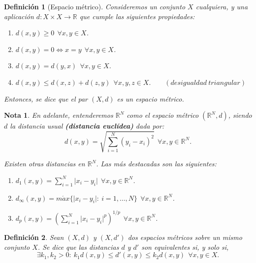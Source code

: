 \documentclass[11pt, a4paper, titlepage]{article}
\providecommand{\abs}[1]{\lvert#1\rvert}
\theoremstyle{theorem-style}
\theoremstyle{definition-style}
\newtheorem*{ndef}{Definición}
\theoremstyle{remark-style}
\newtheorem*{nota}{Nota}
\theoremstyle{example-style}
\newenvironment{nlist}
{\begin{enumerate}
\renewcommand\labelenumi{(\emph{\roman{enumi})}}}
{\end{enumerate}}
\begin{document}
\begin{ndef}[Espacio métrico]
Consideremos un conjunto $X$ cualquiera, y una aplicación \mbox{$d:X\times X \longrightarrow \mathbb{R}$} que cumple las siguientes propiedades:

\begin{nlist}
\item $d(x,y) \ge 0\ \ \forall x,y \in X$.

\item $d(x,y) = 0 \iff x = y\ \ \forall x,y \in X$.

\item $d(x,y) = d(y,x)\ \ \forall x,y \in X$.

\item $d(x,y) \leq d(x,z) + d(z,y)\ \ \forall x,y,z \in X. \quad \quad(desigualdad\ triangular)$

\end{nlist}

Entonces, se dice que el par $(X,d)$ es un \emph{espacio métrico}.
\end{ndef}



\begin{nota}
En adelante, entenderemos $\mathbb{R}^N$ como el espacio métrico $(\mathbb{R}^N,d)$, siendo $d$ la distancia usual \textbf{(distancia euclídea)} dada por: $$d(x,y) = \sqrt{\sum_{i=1}^N (y_i - x_i)^2}\ \ \forall x,y\in \mathbb{R}^N.$$

Existen otras distancias en $\mathbb{R}^N$. Las más destacadas son las siguientes:

\begin{nlist}
\item $\displaystyle d_1(x,y) = \sum_{i=1}^N \abs{x_i - y_i}\ \ \forall x,y \in \mathbb{R}^N$.

\item $\displaystyle d_{\infty}(x,y) = m\acute{a}x \{\abs{x_i - y_i}: \ i=1,\dots,N \}\ \ \forall x,y\in \mathbb{R}^N$.

\item $\displaystyle d_p(x,y) = \left( \sum_{i=1}^N \abs{x_i - y_i}^p \right)^{1/p}\ \ \forall x,y\in \mathbb{R}^N$.\\
\end{nlist}

\end{nota}



\begin{ndef}
Sean $(X,d)$ y $(X,d')$ dos espacios métricos sobre un mismo conjunto $X$. Se dice que las distancias $d$ y $d'$ son \textit{equivalentes} si, y solo si, $$\exists k_1,k_2 > 0 :\ k_1d(x,y)\le d'(x,y) \le k_2d(x,y)\ \ \forall x,y\in X.$$
\end{ndef}
\end{document}

